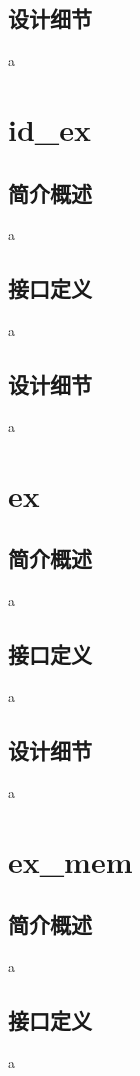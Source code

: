     \subsection{设计细节}
    a

\section{id\_ex}
    
    \subsection{简介概述}
    a

    \subsection{接口定义}
    a

    \subsection{设计细节}
    a

\section{ex}

    \subsection{简介概述}
    a

    \subsection{接口定义}
    a

    \subsection{设计细节}
    a

\section{ex\_mem}

    \subsection{简介概述}
    a

    \subsection{接口定义}
    a

